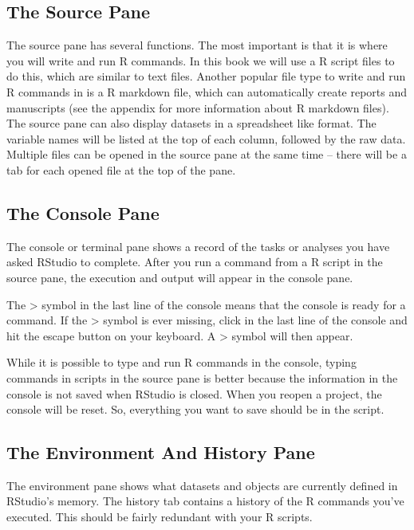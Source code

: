\documentclass[
]{book}
\begin{document}
\hypertarget{the-source-pane}{%
\subsection{The Source Pane}\label{the-source-pane}}

The source pane has several functions. The most important is that it is where you will write and run R commands. In this book we will use a R script files to do this, which are similar to text files. Another popular file type to write and run R commands in is a R markdown file, which can automatically create reports and manuscripts (see the appendix for more information about R markdown files). The source pane can also display datasets in a spreadsheet like format. The variable names will be listed at the top of each column, followed by the raw data. Multiple files can be opened in the source pane at the same time -- there will be a tab for each opened file at the top of the pane.

\hypertarget{the-console-pane}{%
\subsection{The Console Pane}\label{the-console-pane}}

The console or terminal pane shows a record of the tasks or analyses you have asked RStudio to complete. After you run a command from a R script in the source pane, the execution and output will appear in the console pane.

The \textgreater{} symbol in the last line of the console means that the console is ready for a command. If the \textgreater{} symbol is ever missing, click in the last line of the console and hit the escape button on your keyboard. A \textgreater{} symbol will then appear.

While it is possible to type and run R commands in the console, typing commands in scripts in the source pane is better because the information in the console is not saved when RStudio is closed. When you reopen a project, the console will be reset. So, everything you want to save should be in the script.

\hypertarget{the-environment-and-history-pane}{%
\subsection{The Environment And History Pane}\label{the-environment-and-history-pane}}

The environment pane shows what datasets and objects are currently defined in RStudio's memory. The history tab contains a history of the R commands you've executed. This should be fairly redundant with your R scripts.
\end{document}
